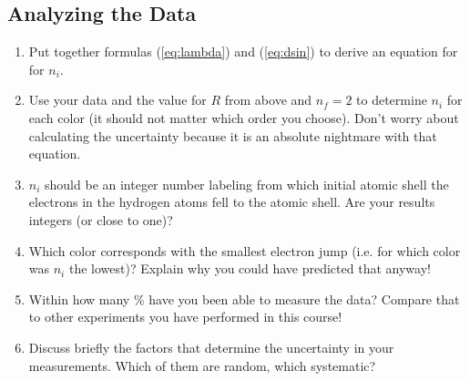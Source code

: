 \subsection{Analyzing the Data}
\begin{enumerate}
\item Put together formulas ({\ref{eq:lambda}}) and ({\ref{eq:dsin}}) to derive an equation for for $n_i$.
\item Use your data and the value for $R$ from above and $n_f=2$ to determine $n_i$ for each color (it should not matter which order you choose). Don't worry about calculating the uncertainty because it is an absolute nightmare  with that equation.
\item $n_i$ should be an integer number labeling from which initial atomic shell the electrons in the hydrogen atoms fell to the  atomic shell. Are your results integers (or close to one)?
\item Which color corresponds with the smallest electron jump (i.e. for which color was $n_i$ the lowest)? Explain why you could have predicted that anyway!
\item Within how many \% have you been able to measure the data? Compare that to other experiments you have performed in this course!
\item Discuss briefly the factors that determine the uncertainty in your measurements. Which of them are random, which systematic?
\end{enumerate}

\newpage
